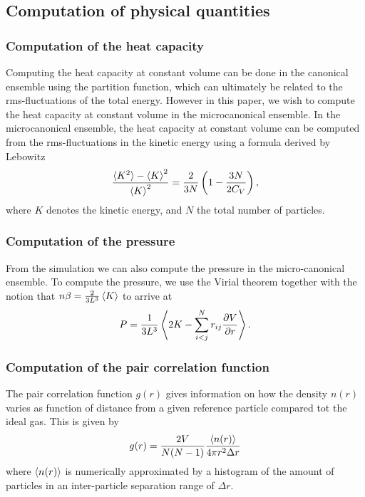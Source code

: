 \documentclass[twoside]{article}
\begin{document}
\subsection{Computation of physical quantities}
\subsubsection*{Computation of the heat capacity}
Computing the heat capacity at constant volume can be done in the canonical ensemble using the partition function, which can ultimately be related to the rms-fluctuations of the total energy. However in this paper, we wish to compute the heat capacity at constant volume in the microcanonical ensemble. In the microcanonical ensemble, the heat capacity at constant volume can be computed from the rms-fluctuations in the kinetic energy using a formula derived by Lebowitz\cite{ref_Lebowitz} 
\begin{equation}
\frac{\braket{K^2} - \braket{K}^2}{\braket{K}^2} = \frac{2}{3N} \left( 1 - \frac{3N}{2C_V} \right),
\label{eq_Lebowitz}
\end{equation}
where $K$ denotes the kinetic energy, and $N$ the total number of particles. 
\subsubsection* {Computation of the pressure}
From the simulation we can also compute the pressure in the micro-canonical ensemble. To compute the pressure, we use the Virial theorem together with the notion that $n\beta = \frac{2}{3L^3} \braket{K}$ to arrive at\cite{ref_Thijssen}
\begin{equation}
P = \frac{1}{3L^3} \Braket{2K - \sum_{i<j}^N r_{ij} \frac{\partial V}{\partial r}}.
\label{eq_pressure_virial}
\end{equation}
\subsubsection* {Computation of the pair correlation function}
The pair correlation function $g(r)$  gives information on how the density $n(r)$ varies as function of distance from a given reference particle compared tot the ideal gas. This is given by\cite{ref_Thijssen}
\begin{equation}\label{eq_correlation}
g(r) = \frac{2V}{N(N-1)}\frac{\braket{n(r)}}{4\pi r^2 \Delta r}
\end{equation}
where $\braket{n(r)}$ is numerically approximated by a histogram of the amount of particles in an inter-particle separation range of $\Delta r$. 
\end{document}
